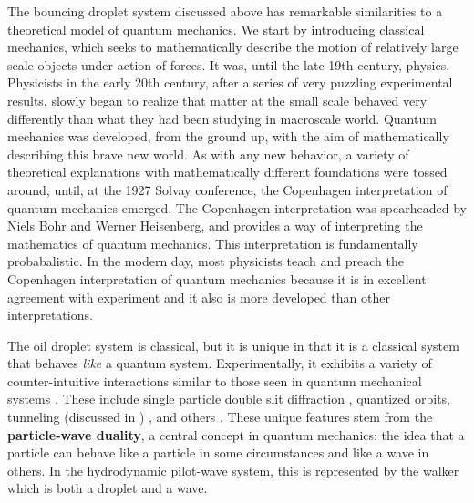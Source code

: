 The bouncing droplet system discussed above has remarkable similarities to a theoretical model of quantum mechanics. We start by introducing classical mechanics, which seeks to mathematically describe the motion of relatively large scale objects under action of forces. It was, until the late 19th century, physics. Physicists in the early 20th century, after a series of very puzzling experimental results, slowly began to realize that matter at the small scale behaved very differently than what they had been studying in macroscale world. Quantum mechanics was developed, from the ground up, with the aim of mathematically describing this brave new world. As with any new behavior, a variety of theoretical explanations with mathematically different foundations were tossed around, until, at the 1927 Solvay conference, the Copenhagen interpretation of quantum mechanics emerged. The Copenhagen interpretation was spearheaded by Niels Bohr and Werner Heisenberg, and provides a way of interpreting the mathematics of quantum mechanics. This interpretation is fundamentally probabalistic. In the modern day, most physicists teach and preach the Copenhagen interpretation of quantum mechanics because it is in excellent agreement with experiment and it also is more developed than other interpretations.

The oil droplet system is classical, but it is unique in that it is a classical system that behaves \textit{like} a quantum system. Experimentally, it exhibits a variety of counter-intuitive interactions similar to those seen in quantum mechanical systems . These include single particle double slit diffraction , quantized orbits, tunneling (discussed in ) , and others . These unique features stem from the \textbf{particle-wave duality}, a central concept in quantum mechanics: the idea that a particle can behave like a particle in some circumstances and like a wave in others. In the hydrodynamic pilot-wave system, this is represented by the walker which is both a droplet and a wave.

